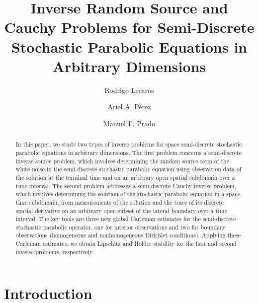 \documentclass[11pt,oneside,leqno]{amsart}
\numberwithin{equation}{section}
\numberwithin{equation}{section}
\begin{document}
\title[Inverse problems for semi-discrete stochastic parabolic  operators]{Inverse Random Source and Cauchy Problems for Semi-Discrete Stochastic Parabolic Equations in Arbitrary Dimensions}
\author[R. Lecaros]{Rodrigo Lecaros}
\address[R. Lecaros]{Departamento de Matem\'atica, Universidad T\'ecnica Federico Santa Mar\'ia,  Santiago, Chile.}
\author[A. A. P\'erez]{Ariel A. P\'erez}
\address[A. A. P\'erez]{Departamento de Matem\'atica, Universidad del B\'io-B\'io, Concepci\'on, Chile.}
\author[M. F. Prado]{Manuel F. Prado}
\address[M. F. Prado]{(Corresponding Author)Departamento de Matem\'atica, Universidad T\'ecnica Federico Santa Mar\'ia,  Santiago, Chile.}
\begin{abstract}
In this paper, we study two types of inverse problems for space semi-discrete stochastic parabolic equations in arbitrary dimensions. The first problem concerns a semi-discrete inverse source problem, which involves determining the random source term of the white noise in the semi-discrete stochastic parabolic equation using observation data of the solution at the terminal time and on an arbitrary open spatial subdomain over a time interval. The second problem addresses a semi-discrete Cauchy inverse problem, which involves determining the solution of the stochastic parabolic equation in a space-time subdomain, from measurements of the solution and the trace of its discrete spatial derivative on an arbitrary open subset of the lateral boundary over a time interval. The key tools are three new global Carleman estimates for the semi-discrete stochastic parabolic operator, one for interior observations and two for boundary observations (homogeneous and nonhomogeneous Dirichlet conditions). Applying these Carleman estimates, we obtain Lipschitz and Hölder stability for the first and second inverse problems, respectively.
\end{abstract}
\maketitle
\tableofcontents 
\section{Introduction}
\end{document}

